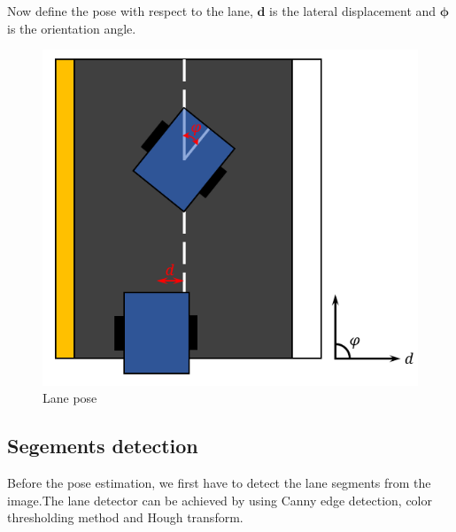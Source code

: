 \documentclass{article}
\begin{document}
\noindent Now define the pose with respect to the lane, $\bm{d}$ is the lateral displacement and $\bm{\phi}$ is the orientation angle.


\begin{figure}[ht]
  \label{fig:lane_pose}
  \centering
  \includegraphics[scale=0.7]{graphs/lane_pose.PNG}
  \caption{Lane pose}
\end{figure}
\FloatBarrier

\subsection{Segements detection}

Before the pose estimation, we first have to detect the lane segments from the image.The lane detector can be achieved by using Canny edge detection, color thresholding method and Hough transform.
\end{document}
